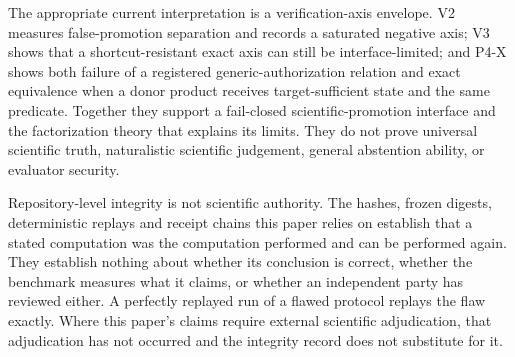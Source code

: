 The appropriate current interpretation is a verification-axis envelope.  V2
measures false-promotion separation and records a saturated negative axis; V3
shows that a shortcut-resistant exact axis can still be interface-limited; and
P4-X shows both failure of a registered generic-authorization relation and exact
equivalence when a donor product receives target-sufficient state and the same
predicate.  Together they support a fail-closed scientific-promotion interface
and the factorization theory that explains its limits.  They do not prove
universal scientific truth, naturalistic scientific judgement, general
abstention ability, or evaluator security.

Repository-level integrity is not scientific authority. The hashes, frozen
digests, deterministic replays and receipt chains this paper relies on establish
that a stated computation was the computation performed and can be performed
again. They establish nothing about whether its conclusion is correct, whether
the benchmark measures what it claims, or whether an independent party has
reviewed either. A perfectly replayed run of a flawed protocol replays the flaw
exactly. Where this paper's claims require external scientific adjudication,
that adjudication has not occurred and the integrity record does not substitute
for it.
